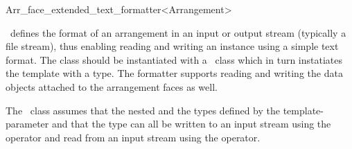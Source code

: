
\ccRefPageBegin

\begin{ccRefClass}{Arr_face_extended_text_formatter<Arrangement>}

\ccDefinition

\ccRefName\ defines the format of an arrangement in an input or output stream
(typically a file stream), thus enabling reading and writing an 
instance using a simple text format. The  class should be
instantiated with a \dcel\ class which in turn instatiates the
 template with a  type.
The formatter supports reading and writing the data objects attached to the
arrangement faces as well.

The \ccRefName\ class assumes that the nested  and the  types
defined by the  template-parameter and that the  type
can all be written to an input stream using the \ccc{<<} operator and read from an input stream using the \ccc{>>} operator.


\ccIsModel
     \\

\ccSeeAlso
     \\
     \\

\end{ccRefClass}

\ccRefPageEnd
